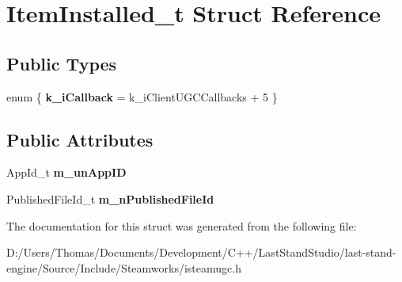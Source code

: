 \hypertarget{structItemInstalled__t}{}\section{Item\+Installed\+\_\+t Struct Reference}
\label{structItemInstalled__t}
\subsection*{Public Types}
\begin{DoxyCompactItemize}
\item 
\hypertarget{structItemInstalled__t_ae9e6f299c8879a092e3c1cacb9bd9d6f}{}enum \{ {\bfseries k\+\_\+i\+Callback} = k\+\_\+i\+Client\+U\+G\+C\+Callbacks + 5
 \}\label{structItemInstalled__t_ae9e6f299c8879a092e3c1cacb9bd9d6f}

\end{DoxyCompactItemize}
\subsection*{Public Attributes}
\begin{DoxyCompactItemize}
\item 
\hypertarget{structItemInstalled__t_a405ff3559800d70aeb52e95e513b950d}{}App\+Id\+\_\+t {\bfseries m\+\_\+un\+App\+I\+D}\label{structItemInstalled__t_a405ff3559800d70aeb52e95e513b950d}

\item 
\hypertarget{structItemInstalled__t_a8450a9bb9ec0e07a168c1426deb757b2}{}Published\+File\+Id\+\_\+t {\bfseries m\+\_\+n\+Published\+File\+Id}\label{structItemInstalled__t_a8450a9bb9ec0e07a168c1426deb757b2}

\end{DoxyCompactItemize}


The documentation for this struct was generated from the following file\+:\begin{DoxyCompactItemize}
\item 
D\+:/\+Users/\+Thomas/\+Documents/\+Development/\+C++/\+Last\+Stand\+Studio/last-\/stand-\/engine/\+Source/\+Include/\+Steamworks/isteamugc.\+h\end{DoxyCompactItemize}
